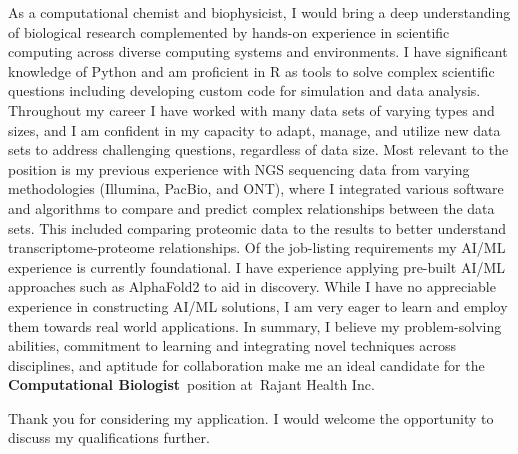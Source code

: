 \documentclass[11pt, a4paper]{awesome-cv}
\newcommand{\companyname}{Rajant Health Inc}
\newcommand{\role}{Computational Biologist}
\newcommand{\brole}{\textbf{\role}}
\begin{document}
\begin{cvletter}
		\vspace{-10pt}		
		\vspace{-7.5pt}
		As a computational chemist and biophysicist, I would bring a deep understanding of biological research complemented by hands-on experience in scientific computing across diverse computing systems and environments. %
		I have significant knowledge of Python and am proficient in R as tools to solve complex scientific questions including developing custom code for simulation and data analysis.
		Throughout my career I have worked with many data sets of varying types and sizes, and I am confident in my capacity to adapt, manage, and utilize new data sets  to address challenging questions, regardless of data size. 
		Most relevant to the position is my previous experience with NGS sequencing data from varying methodologies (Illumina, PacBio, and ONT), where I integrated various software and algorithms to compare and predict complex relationships between the data sets. 
		This included comparing proteomic data to the results to better understand transcriptome-proteome relationships. 
		Of the job-listing requirements my AI/ML experience is currently foundational. I have experience applying pre-built AI/ML approaches such as AlphaFold2 to aid in discovery. While I have no appreciable experience in constructing AI/ML solutions, I am very eager to learn and employ them towards real world applications. 
		In summary, I believe my problem-solving abilities, commitment to learning and integrating novel techniques across disciplines, and aptitude for collaboration make me an ideal candidate for the \brole~position at~\companyname.
	\end{cvletter}

	Thank you for considering my application. I would welcome the opportunity to discuss my qualifications further.
	
	\makeletterclosing
\end{document}
